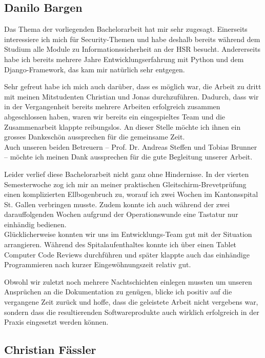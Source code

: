 \subsection{Danilo Bargen}

Das Thema der vorliegenden Bachelorarbeit hat mir sehr zugesagt. Einerseits
interessiere ich mich für Security-Themen und habe deshalb bereits während dem
Studium alle Module zu Informationssicherheit an der HSR besucht. Andererseits
habe ich bereits mehrere Jahre Entwicklungserfahrung mit Python und dem
Django-Framework, das kam mir natürlich sehr entgegen.

Sehr gefreut habe ich mich auch darüber, dass es möglich war, die Arbeit zu
dritt mit meinen Mitstudenten Christian und Jonas durchzuführen. Dadurch, dass
wir in der Vergangenheit bereits mehrere Arbeiten erfolgreich zusammen
abgeschlossen haben, waren wir bereits ein eingespieltes Team und die
Zusammenarbeit klappte reibungslos. An dieser Stelle möchte ich ihnen ein
grosses Dankeschön aussprechen für die gemeinsame Zeit. \\
Auch unseren beiden Betreuern -- Prof. Dr. Andreas Steffen und Tobias Brunner --
möchte ich meinen Dank aussprechen für die gute Begleitung unserer Arbeit.

Leider verlief diese Bachelorarbeit nicht ganz ohne Hindernisse. In der vierten
Semesterwoche zog ich mir an meiner praktischen Gleitschirm-Brevetprüfung einen
komplizierten Ellbogenbruch zu, worauf ich zwei Wochen im Kantonsspital St.
Gallen verbringen musste. Zudem konnte ich auch während der zwei darauffolgenden
Wochen aufgrund der Operationswunde eine Tastatur nur einhändig bedienen.\\
Glücklicherweise konnten wir uns im Entwicklungs-Team gut mit der Situation
arrangieren. Während des Spitalaufenthaltes konnte ich über einen Tablet
Computer Code Reviews durchführen und später klappte auch das einhändige
Programmieren nach kurzer Eingewöhnungszeit relativ gut.

Obwohl wir zuletzt noch mehrere Nachtschichten einlegen mussten um unseren
Ansprüchen an die Dokumentation zu genügen, blicke ich positiv auf die
vergangene Zeit zurück und hoffe, dass die geleistete Arbeit nicht vergebens
war, sondern dass die resultierenden Softwareprodukte auch wirklich erfolgreich
in der Praxis eingesetzt werden können.


\subsection{Christian Fässler} 

